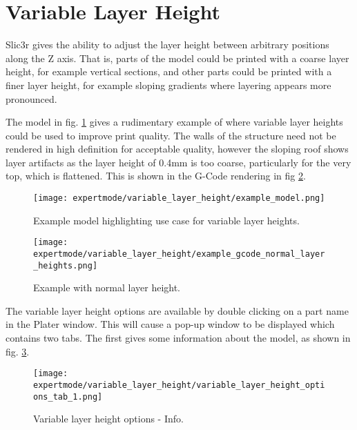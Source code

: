 
\section{Variable Layer Height} %
\label{sec:variable_layer_height}

Slic3r gives the ability to adjust the layer height between arbitrary positions along the Z axis.  That is, parts of the model could be printed with a coarse layer height, for example vertical sections, and other parts could be printed with a finer layer height, for example sloping gradients where layering appears more pronounced.

The model in fig. \ref{fig:example_model} gives a rudimentary example of where variable layer heights could be used to improve print quality.  The walls of the structure need not be rendered in high definition for acceptable quality, however the sloping roof shows layer artifacts as the layer height of 0.4mm is too coarse, particularly for the very top, which is flattened.  This is shown in the G-Code rendering in fig \ref{fig:example_gcode_normal_layer_heights}.


\begin{figure}[H]
\centering
\texttt{[image: expertmode/variable\_layer\_height/example\_model.png]}
\caption{Example model highlighting use case for variable layer heights.}
\label{fig:example_model}
\end{figure}

\begin{figure}[H]
\centering
\texttt{[image: expertmode/variable\_layer\_height/example\_gcode\_normal\_layer\_heights.png]}
\caption{Example with normal layer height.}
\label{fig:example_gcode_normal_layer_heights}
\end{figure}

The variable layer height options are available by double clicking on a part name in the Plater window.  This will cause a pop-up window to be displayed which contains two tabs. The first gives some information about the model, as shown in fig. \ref{fig:variable_layer_height_options_tab_1}.

\begin{figure}[H]
\centering
\texttt{[image: expertmode/variable\_layer\_height/variable\_layer\_height\_options\_tab\_1.png]}
\caption{Variable layer height options - Info.}
\label{fig:variable_layer_height_options_tab_1}
\end{figure}

